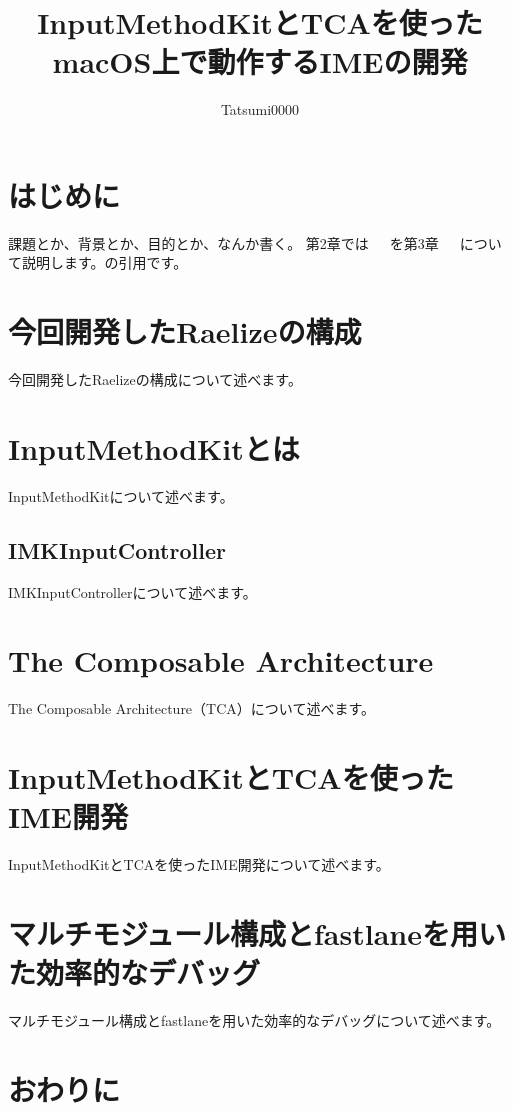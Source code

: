 \documentclass[uplatex,a4j,12pt]{jsarticle}
\begin{document}
\title{\vspace{-10mm}InputMethodKitとTCAを使ったmacOS上で動作するIMEの開発}
\author{Tatsumi0000}
\date{}
\maketitle


\section{はじめに}
課題とか、背景とか、目的とか、なんか書く。
第2章では~~~を第3章~~~について説明します。\cite{Hoge}の引用です。


\section{今回開発したRaelizeの構成}
今回開発したRaelizeの構成について述べます。

\section{InputMethodKitとは}
InputMethodKitについて述べます。

\subsection{IMKInputController}
IMKInputControllerについて述べます。

\section{The Composable Architecture}
The Composable Architecture（TCA）について述べます。

\section{InputMethodKitとTCAを使ったIME開発}
InputMethodKitとTCAを使ったIME開発について述べます。

\section{マルチモジュール構成とfastlaneを用いた効率的なデバッグ}
マルチモジュール構成とfastlaneを用いた効率的なデバッグについて述べます。

\section{おわりに}

 
 
\end{document}
